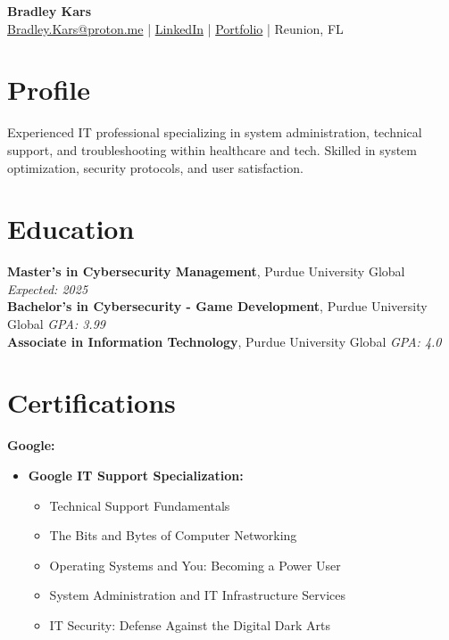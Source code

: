 \documentclass[a4paper,10pt]{article}
\begin{document}
\begin{center}
    {\LARGE \textbf{Bradley Kars}} \\
    \href{mailto:bradley.kars@proton.me}{Bradley.Kars@proton.me} | \href{https://www.linkedin.com/in/bradleykars}{LinkedIn} | \href{https://bradley-kars.github.io/}{Portfolio} | Reunion, FL
\end{center}

\section*{Profile}
Experienced IT professional specializing in system administration, technical support, and troubleshooting within healthcare and tech. Skilled in system optimization, security protocols, and user satisfaction.

\section*{Education}
\noindent\textbf{Master’s in Cybersecurity Management}, Purdue University Global \hfill \textit{Expected: 2025} \\
\noindent\textbf{Bachelor’s in Cybersecurity - Game Development}, Purdue University Global \hfill \textit{GPA: 3.99} \\
\noindent\textbf{Associate in Information Technology}, Purdue University Global \hfill \textit{GPA: 4.0}

\section*{Certifications}

\noindent \textbf{Google:} 
\begin{itemize}[left=2em, label=--]
    \item \textbf{Google IT Support Specialization:}
    \begin{itemize}[left=4em, label=--]
        \item Technical Support Fundamentals
        \item The Bits and Bytes of Computer Networking
        \item Operating Systems and You: Becoming a Power User
        \item System Administration and IT Infrastructure Services
        \item IT Security: Defense Against the Digital Dark Arts
    \end{itemize}
\end{itemize}
\end{document}
